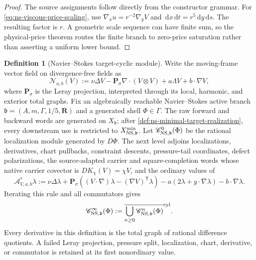 \documentclass[11pt]{article}
\numberwithin{section}{part}
\theoremstyle{plain}
\theoremstyle{definition}
\newtheorem{definition}[definition]{Definition}
\theoremstyle{remark}
\newcommand{\dd}{\,\mathrm d}
\begin{document}
\begin{proof}
The source assignments follow directly from the constructor grammar.  For
\eqref{eq:ns-viscous-price-scaling}, use
\(\nabla_xu=r^{-2}\nabla_yV\) and
\(\dd x\dd t=r^5\dd y\dd s\).  The resulting factor is \(r\).  A geometric
scale sequence can have finite sum, so the physical-price theorem routes the
finite branch to zero-price saturation rather than asserting a uniform lower
bound.
\end{proof}

\begin{definition}[Navier--Stokes target-cyclic module]
\label{def:ns-target-cyclic-module}
Write the moving-frame vector field on divergence-free fields as
\[
 \mathcal N_{a,b}(V)
 :=\nu\Delta V-\mathbf P_\sigma\nabla\!\cdot(V\otimes V)
   +a\Lambda V+b\cdot\nabla V,
\]
where \(\mathbf P_\sigma\) is the Leray projection, interpreted through its
local, harmonic, and exterior total graphs.  Fix an algebraically reachable Navier--Stokes
active branch \(\mathfrak b=(A,m,\Gamma,1/5,\mathbf R)\) and a generated
shell \(\Phi\in\Gamma\).  The raw forward and backward words are generated
on \(X_{\mathfrak b}\); after
\cref{def:ns-minimal-target-realization}, every downstream use is restricted
to \(X^{\min}_{{\rm NS},\mathfrak b}\).  Let
\(\mathscr C^0_{{\rm NS},\mathfrak b}(\Phi)\) be the rational localization module
generated by \(D\Phi\).  The next level adjoins localizations, derivatives,
chart pullbacks, constraint descents, pressure-tail coordinates, defect
polarizations, the source-adapted carrier and square-completion words whose
native carrier covector is
\(DK_\chi(V)=\chi V\), and the ordinary values of
\begin{equation}
 \label{eq:ns-adjoint-linearized-operator}
 \mathcal A^*_{V,a,b}\lambda
 :=\nu\Delta\lambda
   +\mathbf P_\sigma\!\left((V\cdot\nabla)\lambda
                    -(\nabla V)^{\mathsf T}\lambda\right)
   -a(2\lambda+y\cdot\nabla\lambda)-b\cdot\nabla\lambda.
\end{equation}
Iterating this rule and all commutators gives
\begin{equation}
 \label{eq:ns-target-cyclic-module}
 \mathscr C^\infty_{{\rm NS},\mathfrak b}(\Phi)
 :=\overline{\bigcup_{n\ge0}\mathscr C^n_{{\rm NS},\mathfrak b}(\Phi)}^{\rm cyl}.
\end{equation}
Every derivative in this definition is the total graph of rational
difference quotients.  A failed Leray projection, pressure split,
localization, chart, derivative, or commutator is retained at its first
nonordinary value.
\end{definition}
\end{document}
